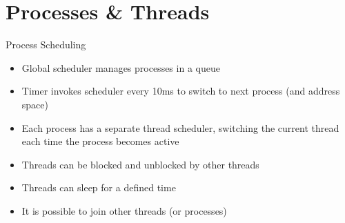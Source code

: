 \section{Processes \& Threads}

\begin{frame}{Process Scheduling}
	\begin{itemize}
		\setlength\itemsep{1em}
		\item Global scheduler manages processes in a queue
		\item Timer invokes scheduler every 10ms to switch to next process (and address space)
		\item Each process has a separate thread scheduler, switching the current thread each time the process becomes active
		\item Threads can be blocked and unblocked by other threads
		\item Threads can sleep for a defined time
		\item It is possible to join other threads (or processes)
	\end{itemize}	
\end{frame}
